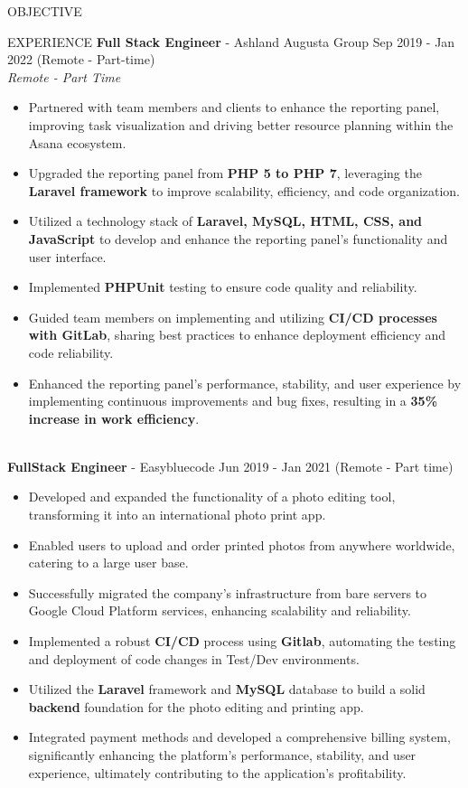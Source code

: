 \documentclass{resume} %
\begin{document}
\begin{rSection}{OBJECTIVE}
\begin{rSection}{EXPERIENCE}
\textbf{Full Stack Engineer} - Ashland Augusta Group \hfill Sep 2019 - Jan 2022 (Remote - Part-time)\\
 \hfill \textit{Remote - Part Time}
 \begin{itemize}
    \itemsep -3pt {} 
    \item Partnered with team members and clients to enhance the reporting panel, improving task visualization and driving better resource planning within the Asana ecosystem.
\item Upgraded the reporting panel from \textbf{PHP 5 to PHP 7}, leveraging the \textbf{Laravel framework} to improve
scalability, efficiency, and code organization.
\item Utilized a technology stack of \textbf{Laravel, MySQL, HTML, CSS, and JavaScript} to develop and enhance
the reporting panel's functionality and user interface.
\item Implemented \textbf{PHPUnit} testing to ensure code quality and reliability.
\item Guided team members on implementing and utilizing \textbf{CI/CD processes with GitLab}, sharing best practices to enhance deployment efficiency and code reliability.
\item Enhanced the reporting panel’s performance, stability, and user experience by implementing continuous improvements and bug fixes, resulting in a \textbf{35\% increase in work efficiency}.
\\
\\
 \end{itemize}
 \textbf{FullStack Engineer} -  Easybluecode \hfill Jun 2019 - Jan 2021 (Remote - Part time)\\
 \begin{itemize}
    \itemsep -3pt {} 
   \item Developed and expanded the functionality of a photo editing tool, transforming it into an international
photo print app.
\item Enabled users to upload and order printed photos from anywhere worldwide, catering to a large user base.
\item Successfully migrated the company's infrastructure from bare servers to Google Cloud Platform
services, enhancing scalability and reliability.
\item Implemented a robust \textbf{CI/CD} process using \textbf{Gitlab}, automating the testing and deployment of code
changes in Test/Dev environments.
\item Utilized the \textbf{Laravel} framework and \textbf{MySQL} database to build a solid \textbf{backend} foundation for the photo
editing and printing app.
\item Integrated payment methods and developed a comprehensive billing system, significantly enhancing the platform’s performance, stability, and user experience, ultimately contributing to the application’s profitability.
\\
\\
 \end{itemize}


\end{rSection}
\end{rSection}
\end{document}
